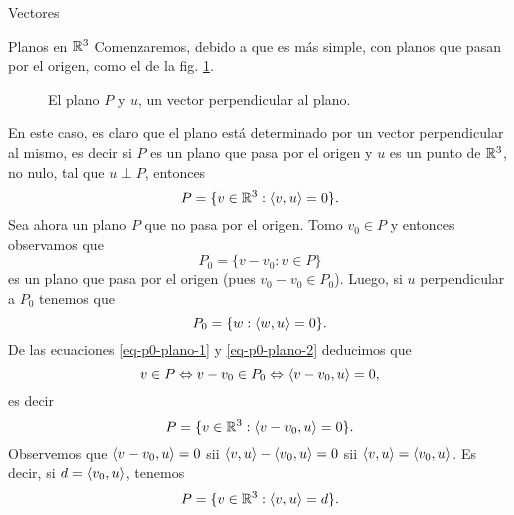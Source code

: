 \begin{chapter}{Vectores}
\begin{section}{Planos en $\mathbb R^3$}
        Comenzaremos, debido a que es más simple, con planos que  pasan por el origen,  como el de la fig. \ref{fig-plano-por-origen}.
        \begin{figure}[h]
        	\centering
            \caption{El plano $P$ y $u$, un vector  perpendicular al plano.}
            \label{fig-plano-por-origen}
        \end{figure} 
    
        En  este caso,  es claro que el plano está determinado por un vector perpendicular al mismo, es decir si $P$  es un plano que pasa por el origen y $u$ es un punto de $\mathbb R^3$, no nulo, tal que $u \perp P$,  entonces
        \begin{equation*}
            P = \{ v \in \mathbb R^3: \langle v,u \rangle=0 \}. 
        \end{equation*}
        Sea ahora un  plano $P$ que no pasa por el origen.  Tomo $v_0 \in P$ y entonces observamos que
        \begin{equation}\label{eq-p0-plano-1}
            P_0 = \{v-v_0: v \in P \}
        \end{equation} 
        es un plano que pasa por el origen (pues $v_0-v_0 \in P_0$). Luego,  si $u$ perpendicular a $P_0$ tenemos que
        \begin{equation}\label{eq-p0-plano-2}
        P_0 = \{w: \langle w,u \rangle=0\}.
        \end{equation}
        De las ecuaciones \eqref{eq-p0-plano-1} y  \eqref{eq-p0-plano-2} deducimos que 
        \begin{equation*}
            v \in P \Leftrightarrow v-v_0 \in P_0 \Leftrightarrow \langle v-v_0,u \rangle=0,
        \end{equation*}
         es decir
        \begin{equation*}
            P = \{ v \in \mathbb R^3: \langle v-v_0,u \rangle=0 \}. 
        \end{equation*}  
        Observemos que  $\langle v-v_0,u \rangle=0$ sii $\langle v,u \rangle-\langle v_0,u \rangle=0$ sii $\langle v,u \rangle=\langle v_0,u \rangle$. Es decir, si $d = \langle v_0,u \rangle$, tenemos
        \begin{equation*}
        P = \{ v \in \mathbb R^3: \langle v,u \rangle=d \}. 
        \end{equation*} 
        

\end{section}
\end{chapter}
